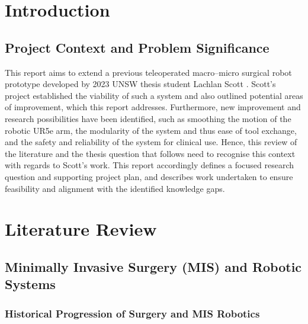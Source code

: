 \documentclass[12pt]{article}
\begin{document}
\newpage
\hypersetup{pageanchor=true}

\section{Introduction}
\subsection{Project Context and Problem Significance}
This report aims to extend a previous teleoperated macro--micro surgical robot prototype developed by 2023 UNSW thesis student Lachlan Scott \cite{scott2023macro}.
Scott's project established the viability of such a system and also outlined potential areas of improvement, which this report addresses. Furthermore, new improvement and research possibilities 
have been identified, such as smoothing the motion of the robotic UR5e arm,
the modularity of the system and thus ease of tool exchange, and the safety and reliability of the system for clinical use.
Hence, this review of the literature and the thesis question that follows need to recognise this context with regards to Scott's work.
This report accordingly defines a focused research question and supporting project plan, and describes work undertaken to ensure feasibility 
and alignment with the identified knowledge gaps.

\section{Literature Review}
\subsection{Minimally Invasive Surgery (MIS) and Robotic Systems}

\subsubsection{Historical Progression of Surgery and MIS Robotics}
\end{document}
